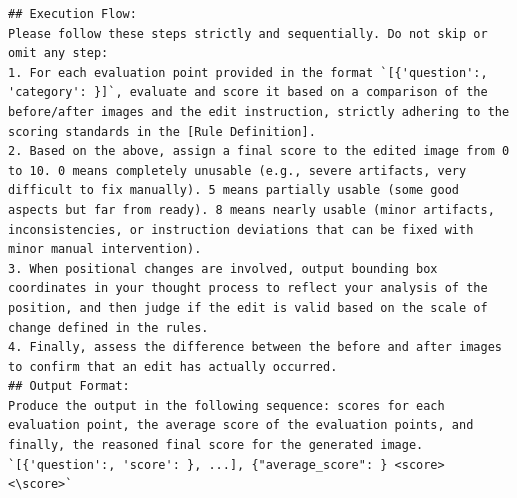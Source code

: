 \begin{lstlisting}
## Execution Flow:
Please follow these steps strictly and sequentially. Do not skip or omit any step:
1. For each evaluation point provided in the format `[{'question':, 'category': }]`, evaluate and score it based on a comparison of the before/after images and the edit instruction, strictly adhering to the scoring standards in the [Rule Definition].
2. Based on the above, assign a final score to the edited image from 0 to 10. 0 means completely unusable (e.g., severe artifacts, very difficult to fix manually). 5 means partially usable (some good aspects but far from ready). 8 means nearly usable (minor artifacts, inconsistencies, or instruction deviations that can be fixed with minor manual intervention).
3. When positional changes are involved, output bounding box coordinates in your thought process to reflect your analysis of the position, and then judge if the edit is valid based on the scale of change defined in the rules.
4. Finally, assess the difference between the before and after images to confirm that an edit has actually occurred.
## Output Format:
Produce the output in the following sequence: scores for each evaluation point, the average score of the evaluation points, and finally, the reasoned final score for the generated image.
`[{'question':, 'score': }, ...], {"average_score": } <score> <\score>`
\end{lstlisting}


